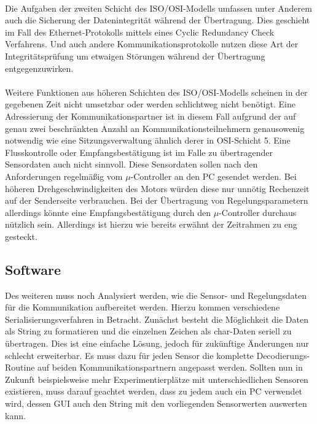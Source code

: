 \paragraph{}
Die Aufgaben der zweiten Schicht des ISO/OSI-Modells umfassen unter Anderem auch die Sicherung der Datenintegrität während der Übertragung. Dies geschieht im Fall des Ethernet-Protokolls mittels eines Cyclic Redundancy Check Verfahrens. Und auch andere Kommunikationsprotokolle nutzen diese Art der Integritätsprüfung um etwaigen Störungen während der Übertragung entgegenzuwirken.
\paragraph{}
Weitere Funktionen aus höheren Schichten des ISO/OSI-Modells scheinen in der gegebenen Zeit nicht umsetzbar oder werden schlichtweg nicht benötigt. Eine Adressierung der Kommunikationspartner ist in diesem Fall aufgrund der auf genau zwei beschränkten Anzahl an Kommunikationsteilnehmern genausowenig notwendig wie eine Sitzungsverwaltung ähnlich derer in OSI-Schicht 5. Eine Flusskontrolle oder Empfangsbestätigung ist im Falle zu übertragender Sensordaten auch nicht sinnvoll. Diese Sensordaten sollen nach den Anforderungen regelmäßig vom $\mu$-Controller an den PC gesendet werden. Bei höheren Drehgeschwindigkeiten des Motors würden diese nur unnötig Rechenzeit auf der Senderseite verbrauchen. Bei der Übertragung von Regelungsparametern allerdings könnte eine Empfangsbestätigung durch den $\mu$-Controller durchaus nützlich sein. Allerdings ist hierzu wie bereits erwähnt der Zeitrahmen zu eng gesteckt.
\subsection{Software}
Des weiteren muss noch Analysiert werden, wie die Sensor- und Regelungsdaten für die Kommunikation aufbereitet werden. Hierzu kommen verschiedene Serialisierungsverfahren in Betracht. Zunächst besteht die Möglichkeit die Daten als String zu formatieren und die einzelnen Zeichen als char-Daten seriell zu übertragen. Dies ist eine einfache Lösung, jedoch für zukünftige Änderungen nur schlecht erweiterbar. Es muss dazu für jeden Sensor die komplette Decodierungs-Routine auf beiden Kommunikationspartnern angepasst werden. Sollten nun in Zukunft beispielsweise mehr Experimentierplätze mit unterschiedlichen Sensoren existieren, muss darauf geachtet werden, dass zu jedem auch ein PC verwendet wird, dessen GUI auch den String mit den vorliegenden Sensorwerten auswerten kann.
